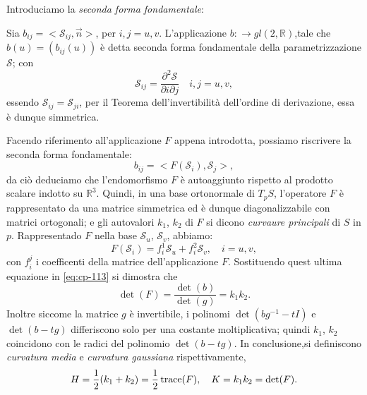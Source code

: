 Introduciamo la \emph{seconda forma fondamentale}:
\begin{definizione}
Sia $b_{ij}=<\mathcal{S}_{ij},\vec{n}>$, per $i,j=u,v$. L'applicazione $b:\longrightarrow gl(2,\mathbb{R})$,tale che $b(u)=(b_{ij}(u))$ è detta seconda forma fondamentale della parametrizzazione $\mathcal{S}$; con
\[
\mathcal{S}_{ij}=\frac{\partial^2\mathcal{S}}{\partial i\partial j}\quad i,j = u,v,
\]
essendo $\mathcal{S}_{ij}=\mathcal{S}_{ji}$, per il Teorema dell'invertibilità dell'ordine di derivazione, essa è dunque simmetrica.
\end{definizione}
Facendo riferimento all'applicazione $F$ appena introdotta, possiamo riscrivere la seconda forma fondamentale:
\begin{equation}
\label{eq:cp-113}
b_{ij}=<F(\mathcal{S}_i),\mathcal{S}_j>,
\end{equation}
da ciò deduciamo che l'endomorfismo $F$ è autoaggiunto rispetto al prodotto scalare indotto su $\mathbb{R}^3$. Quindi, in una base ortonormale di $T_pS$, l'operatore $F$ è rappresentato da una matrice simmetrica ed è dunque diagonalizzabile con matrici ortogonali; e gli autovalori $k_1$, $k_2$ di $F$ si dicono \emph{curvaure principali} di $S$ in $p$. Rappresentado $F$ nella base $\mathcal{S}_u$, $\mathcal{S}_v$, abbiamo:
\[
F(\mathcal{S}_i) = f_i^1\mathcal{S}_u + f_i^2\mathcal{S}_v,\quad i=u,v,
\]
con $f_i^j$ i coefficenti della matrice dell'applicazione $F$. Sostituendo quest ultima equazione in \eqref{eq:cp-113} si dimostra che
\[
\det(F) = \frac{\det(b)}{\det(g)}=k_1k_2.
\]
Inoltre siccome la matrice $g$ è invertibile, i polinomi $\det(bg^{-1}-tI)$ e $\det(b-tg)$ differiscono solo per una costante moltiplicativa; quindi $k_1$, $k_2$ coincidono con le radici del polinomio $\det(b-tg)$.
In conclusione,si definiscono \emph{curvatura media} e \emph{curvatura gaussiana} rispettivamente,
\[
H=\frac{1}{2}(k_1+k_2)=\frac{1}{2}\operatorname{trace}(F),\quad K=k_1k_2=\det(F).
\]
